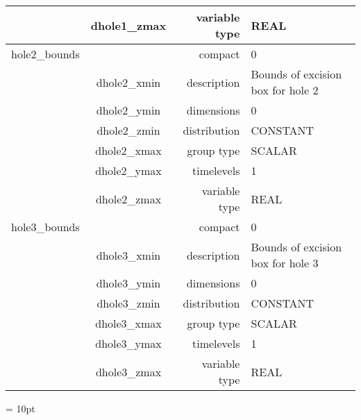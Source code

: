 \begin{tabular*}{150mm}{|c|c@{\extracolsep{\fill}}|rl|}
 & dhole1\_zmax & variable type & REAL \\ 
\hline 
hole2\_bounds &  & compact & 0 \\ 
 & dhole2\_xmin & description & Bounds of excision box for hole 2 \\ 
 & dhole2\_ymin & dimensions & 0 \\ 
 & dhole2\_zmin & distribution & CONSTANT \\ 
 & dhole2\_xmax & group type & SCALAR \\ 
 & dhole2\_ymax & timelevels & 1 \\ 
 & dhole2\_zmax & variable type & REAL \\ 
\hline 
hole3\_bounds &  & compact & 0 \\ 
 & dhole3\_xmin & description & Bounds of excision box for hole 3 \\ 
 & dhole3\_ymin & dimensions & 0 \\ 
 & dhole3\_zmin & distribution & CONSTANT \\ 
 & dhole3\_xmax & group type & SCALAR \\ 
 & dhole3\_ymax & timelevels & 1 \\ 
 & dhole3\_zmax & variable type & REAL \\ 
\hline 
\end{tabular*} 



\vspace{5mm}\parskip = 10pt 
